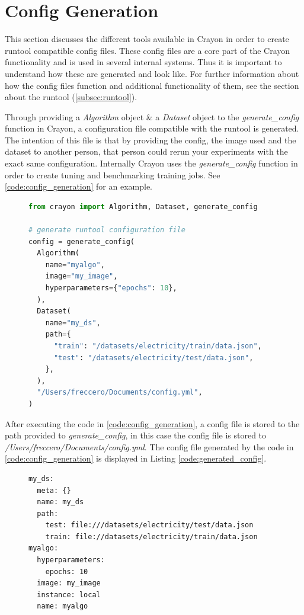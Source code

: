 \section{Config Generation}
\label{'subsub:config_generation'}
This section discusses the different tools available in Crayon in order to create runtool compatible config files. These config files are a core part of the Crayon functionality and is used in several internal systems. Thus it is important to understand how these are generated and look like. For further information about how the config files function and additional functionality of them, see the section about the runtool (\ref{subsec:runtool}).

Through providing a \textit{Algorithm} object \& a \textit{Dataset} object to the \textit{generate\_config} function in Crayon, a configuration file compatible with the runtool is generated. The intention of this file is that by providing the config, the image used and the dataset to another person, that person could rerun your experiments with the exact same configuration. Internally Crayon uses the \textit{generate\_config} function in order to create tuning and benchmarking training jobs. See \ref{code:config_generation} for an example.
\begin{figure}
  \begin{lstlisting}[language=Python, label={code:config_generation}, caption={Config generation using Crayon}]
from crayon import Algorithm, Dataset, generate_config

# generate runtool configuration file
config = generate_config(
  Algorithm(
    name="myalgo",
    image="my_image",
    hyperparameters={"epochs": 10},
  ),
  Dataset(
    name="my_ds",
    path={
      "train": "/datasets/electricity/train/data.json",
      "test": "/datasets/electricity/test/data.json",
    },
  ),
  "/Users/freccero/Documents/config.yml",
)
\end{lstlisting}
\end{figure}

After executing the code in \ref{code:config_generation}, a config file is stored to the path provided to \textit{generate\_config}, in this case the config file is stored to \textit{/Users/freccero/Documents/config.yml}. The config file generated by the code in \ref{code:config_generation} is displayed in Listing \ref{code:generated_config}.
\begin{figure}
  \begin{lstlisting}[label={code:generated_config}, caption={Generated configurations file.}]
my_ds:
  meta: {}
  name: my_ds
  path:
    test: file:///datasets/electricity/test/data.json
    train: file://datasets/electricity/train/data.json
myalgo:
  hyperparameters:
    epochs: 10
  image: my_image
  instance: local
  name: myalgo
\end{lstlisting}
\end{figure}


